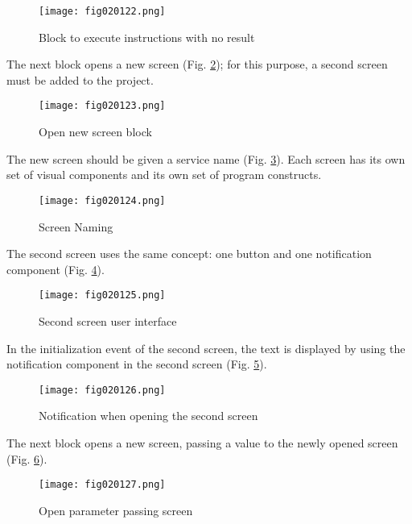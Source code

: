 \begin{figure}[H]
   \centering
   \texttt{[image: fig020122.png]}
   \caption{Block to execute instructions with no result}
\label{fig020122}
\end{figure}

The next block opens a new screen (Fig. \ref{fig020123}); for this purpose, a second screen must be added to the project.

\begin{figure}[H]
   \centering
   \texttt{[image: fig020123.png]}
   \caption{Open new screen block}
\label{fig020123}
\end{figure}

The new screen should be given a service name (Fig. \ref{fig020124}). Each screen has its own set of visual components and its own set of program constructs.

\begin{figure}[H]
   \centering
   \texttt{[image: fig020124.png]}
   \caption{Screen Naming}
\label{fig020124}
\end{figure}

The second screen uses the same concept: one button and one notification component (Fig. \ref{fig020125}).

\begin{figure}[H]
   \centering
   \texttt{[image: fig020125.png]}
   \caption{Second screen user interface}
\label{fig020125}
\end{figure}

In the initialization event of the second screen, the text is displayed by using the notification component in the second screen (Fig. \ref{fig020126}).

\begin{figure}[H]
   \centering
   \texttt{[image: fig020126.png]}
   \caption{Notification when opening the second screen}
\label{fig020126}
\end{figure}

The next block opens a new screen, passing a value to the newly opened screen (Fig. \ref{fig020127}).

\begin{figure}[H]
   \centering
   \texttt{[image: fig020127.png]}
   \caption{Open parameter passing screen}
\label{fig020127}
\end{figure}

